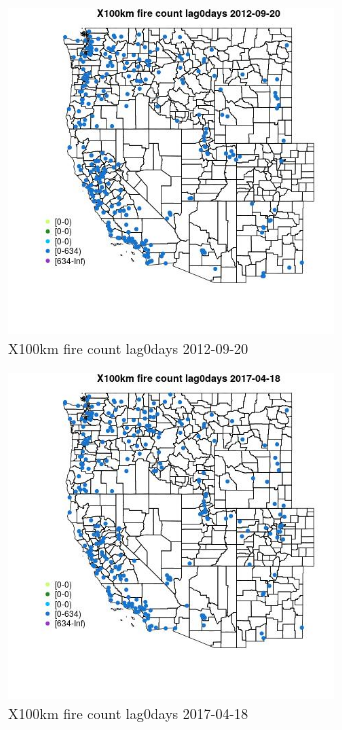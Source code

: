 \begin{figure} 
\centering  
\includegraphics[width=0.77\textwidth]{Code_Outputs/Report_ML_input_PM25_Step4_part_e_de_duplicated_aves_compiled_2019-05-14wNAs_MapObsX100km_fire_count_lag0days2012-09-20.jpg} 
\caption{\label{fig:Report_ML_input_PM25_Step4_part_e_de_duplicated_aves_compiled_2019-05-14wNAsMapObsX100km_fire_count_lag0days2012-09-20}X100km fire count lag0days 2012-09-20} 
\end{figure} 
 

\begin{figure} 
\centering  
\includegraphics[width=0.77\textwidth]{Code_Outputs/Report_ML_input_PM25_Step4_part_e_de_duplicated_aves_compiled_2019-05-14wNAs_MapObsX100km_fire_count_lag0days2017-04-18.jpg} 
\caption{\label{fig:Report_ML_input_PM25_Step4_part_e_de_duplicated_aves_compiled_2019-05-14wNAsMapObsX100km_fire_count_lag0days2017-04-18}X100km fire count lag0days 2017-04-18} 
\end{figure} 
 

